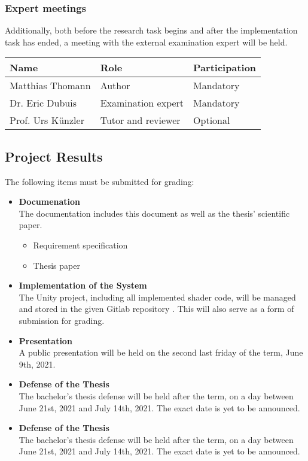 \subsubsection{Expert meetings}
Additionally, both before the research task begins and after the implementation task has ended, a meeting with the external examination expert will be held.
\emptyline
\noindent\begin{tabular}{|l|l|l|}
    \hline
    \textbf{Name}       & \textbf{Role}         & \textbf{Participation}\\ \hline
    Matthias Thomann    & Author                & Mandatory             \\ \hline
    Dr. Eric Dubuis     & Examination expert    & Mandatory             \\ \hline
    Prof. Urs Künzler   & Tutor and reviewer    & Optional              \\ \hline
\end{tabular}
\emptyline


\clearpage

\subsection{Project Results}
The following items must be submitted for grading:
\begin{itemize}
    \item \textbf{Documenation} \\
    The documentation includes this document as well as the thesis' scientific paper.
    \begin{itemize}
        \item Requirement specification
        \item Thesis paper
    \end{itemize}
    \item \textbf{Implementation of the System} \\
    The Unity project, including all implemented shader code, will be managed and stored in the given Gitlab repository \cite{gitlab}. This will also serve as a form of submission for grading.
    \item \textbf{Presentation} \\
    A public presentation will be held on the second last friday of the term, June 9th, 2021.
    \item \textbf{Defense of the Thesis} \\
    The bachelor's thesis defense will be held after the term, on a day between June 21st, 2021 and July 14th, 2021. The exact date is yet to be announced. 
    \item \textbf{Defense of the Thesis} \\
    The bachelor's thesis defense will be held after the term, on a day between June 21st, 2021 and July 14th, 2021. The exact date is yet to be announced. 
\end{itemize}

